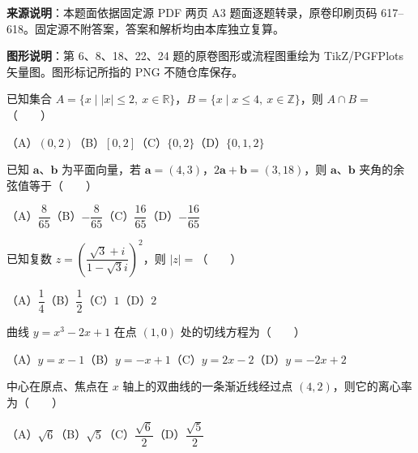 


\begin{gktip}
\textbf{来源说明}：本题面依据固定源 PDF 两页 A3 题面逐题转录，原卷印刷页码 617–618。固定源不附答案，答案和解析均由本库独立复算。

\textbf{图形说明}：第 6、8、18、22、24 题的原卷图形或流程图重绘为 TikZ/PGFPlots 矢量图。图形标记所指的 PNG 不随仓库保存。
\end{gktip}


\begin{question}
已知集合 $A=\{x\mid |x|\leq2,\ x\in\mathbb R\}$，$B=\{x\mid x\leq4,\ x\in\mathbb Z\}$，则 $A\cap B=$\mbox{（　　）}

（A）$(0,2)$\quad（B）$[0,2]$\quad（C）$\{0,2\}$\quad（D）$\{0,1,2\}$

\end{question}
\begin{question}
已知 $\boldsymbol a\text{、}\boldsymbol b$ 为平面向量，若 $\boldsymbol a=(4,3)$，$2\boldsymbol a+\boldsymbol b=(3,18)$，则 $\boldsymbol a\text{、}\boldsymbol b$ 夹角的余弦值等于\mbox{（　　）}

（A）$\dfrac8{65}$\quad（B）$-\dfrac8{65}$\quad（C）$\dfrac{16}{65}$\quad（D）$-\dfrac{16}{65}$

\end{question}
\begin{question}
已知复数 $z=\left(\dfrac{\sqrt3+i}{1-\sqrt3i}\right)^2$，则 $|z|=$\mbox{（　　）}

（A）$\dfrac14$\quad（B）$\dfrac12$\quad（C）$1$\quad（D）$2$

\end{question}
\begin{question}
曲线 $y=x^3-2x+1$ 在点 $(1,0)$ 处的切线方程为\mbox{（　　）}

（A）$y=x-1$\quad（B）$y=-x+1$\quad（C）$y=2x-2$\quad（D）$y=-2x+2$

\end{question}
\begin{question}
中心在原点、焦点在 $x$ 轴上的双曲线的一条渐近线经过点 $(4,2)$，则它的离心率为\mbox{（　　）}

（A）$\sqrt6$\quad（B）$\sqrt5$\quad（C）$\dfrac{\sqrt6}{2}$\quad（D）$\dfrac{\sqrt5}{2}$

\Needspace{0.4\textheight}
\end{question}
